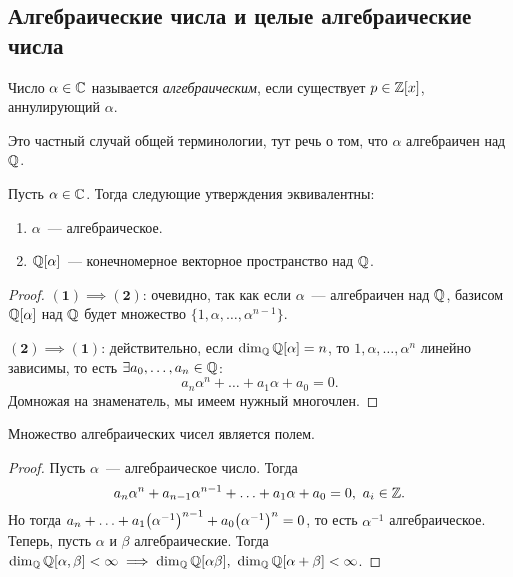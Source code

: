 \subsection{Алгебраические числа и целые алгебраические числа}

	\begin{definition} 
		Число $\alpha \in \mathbb{C}$ называется \emph{алгебраическим}, если существует $p \in \mathbb{Z}[x]$, аннулирующий $\alpha$. 
	\end{definition}

	\begin{remark}
		Это частный случай общей терминологии, тут речь о том, что $\alpha$ алгебраичен над $\mathbb{Q}$.
	\end{remark}

	\begin{statement} 
		Пусть $\alpha \in \mathbb{C}$. Тогда следующие утверждения эквивалентны: 
		\begin{enumerate}
			\item $\alpha$~--- алгебраическое. 
			\item $\mathbb{Q}[\alpha]$~--- конечномерное векторное пространство над $\mathbb{Q}$.
		\end{enumerate}
	\end{statement}

	\begin{proof}
		$\mathbf{(1) \implies (2)}$: очевидно, так как если $\alpha$~--- алгебраичен над $\mathbb{Q}$,  базисом $\mathbb{Q}[\alpha]$ над $\mathbb{Q}$ будет множество $\{ 1, \alpha, \ldots, \alpha^{n - 1} \}$.

		$\mathbf{(2) \implies (1)}$: действительно, если $\dim_{\mathbb{Q}} \mathbb{Q}[\alpha] = n$, то $1, \alpha, \ldots, \alpha^n$ линейно зависимы, то есть $\exists a_0, \ldots, a_n \in \mathbb{Q}$:
		\[
			a_n \alpha^n + \ldots + a_1 \alpha + a_0 = 0.
		\]
		Домножая на знаменатель, мы имеем нужный многочлен. 
	\end{proof}

	\begin{statement} 
		Множество алгебраических чисел является полем. 
	\end{statement}
	\begin{proof}
		Пусть $\alpha$~--- алгебраическое число. Тогда 
		\[
			a_n \alpha^n + a_{n - 1}\alpha^{n - 1} + \ldots + a_1 \alpha + a_0 = 0, \ a_i \in \mathbb{Z}.
		\]
		Но тогда $a_n + \ldots + a_1 \lr*{\alpha^{-1}}^{n - 1} + a_0 \lr*{\alpha^{-1}}^{n} = 0$, то есть $\alpha^{-1}$ алгебраическое. Теперь, пусть $\alpha$ и $\beta$ алгебраические. Тогда 
		$\dim_{\Q}\Q[\alpha, \beta] < \infty \implies \dim_{\Q}\Q[\alpha \beta], \ \dim_{\Q}\Q[\alpha + \beta] < \infty$.    

	\end{proof}

